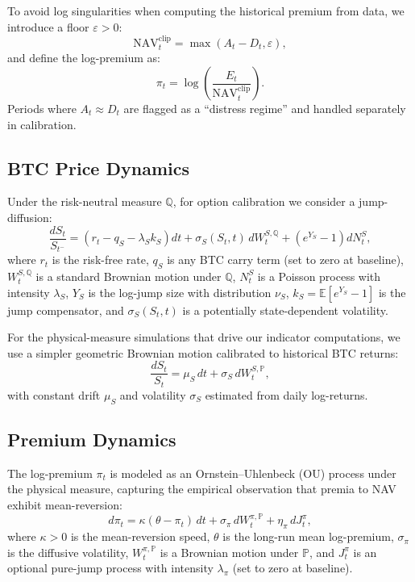 To avoid log singularities when computing the historical premium from data, we introduce a floor $\varepsilon > 0$:
\begin{equation}
    \text{NAV}_t^{\text{clip}} = \max(A_t - D_t, \varepsilon),
\end{equation}
and define the log-premium as:
\begin{equation}
    \pi_t = \log\left(\frac{E_t}{\text{NAV}_t^{\text{clip}}}\right).
\end{equation}
Periods where $A_t \approx D_t$ are flagged as a ``distress regime'' and handled separately in calibration.

\subsection{BTC Price Dynamics}

Under the risk-neutral measure $\mathbb{Q}$, for option calibration we consider a jump-diffusion:
\begin{equation}
    \frac{dS_t}{S_{t^-}} = \left(r_t - q_S - \lambda_S k_S\right) dt + \sigma_S(S_t, t)\, dW_t^{S,\mathbb{Q}} + \left(e^{Y_S} - 1\right) dN_t^S,
\end{equation}
where $r_t$ is the risk-free rate, $q_S$ is any BTC carry term (set to zero at baseline), $W_t^{S,\mathbb{Q}}$ is a standard Brownian motion under $\mathbb{Q}$, $N_t^S$ is a Poisson process with intensity $\lambda_S$, $Y_S$ is the log-jump size with distribution $\nu_S$, $k_S = \mathbb{E}[e^{Y_S} - 1]$ is the jump compensator, and $\sigma_S(S_t, t)$ is a potentially state-dependent volatility.

For the physical-measure simulations that drive our indicator computations, we use a simpler geometric Brownian motion calibrated to historical BTC returns:
\begin{equation}
    \frac{dS_t}{S_t} = \mu_S\, dt + \sigma_S\, dW_t^{S,\mathbb{P}},
\end{equation}
with constant drift $\mu_S$ and volatility $\sigma_S$ estimated from daily log-returns.

\subsection{Premium Dynamics}

The log-premium $\pi_t$ is modeled as an Ornstein--Uhlenbeck (OU) process under the physical measure, capturing the empirical observation that premia to NAV exhibit mean-reversion:
\begin{equation}
    d\pi_t = \kappa(\theta - \pi_t)\, dt + \sigma_\pi\, dW_t^{\pi,\mathbb{P}} + \eta_\pi\, dJ_t^\pi,
\end{equation}
where $\kappa > 0$ is the mean-reversion speed, $\theta$ is the long-run mean log-premium, $\sigma_\pi$ is the diffusive volatility, $W_t^{\pi,\mathbb{P}}$ is a Brownian motion under $\mathbb{P}$, and $J_t^\pi$ is an optional pure-jump process with intensity $\lambda_\pi$ (set to zero at baseline).

